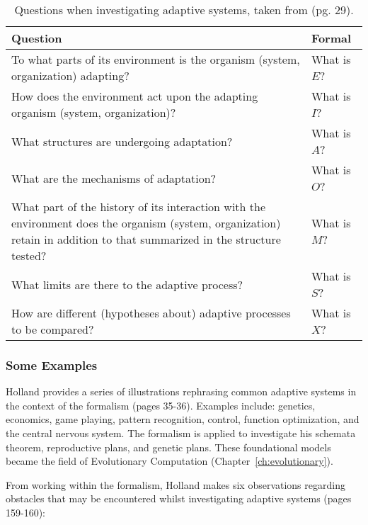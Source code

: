 \begin{table}[ht]
	\centering\small
		\begin{tabularx}{\textwidth}{Xl}
		\toprule
		\textbf{Question} & \textbf{Formal} \\ 
		\toprule
		To what parts of its environment is the organism (system, organization) adapting? & What is $E$? \\ 
		\midrule
		How does the environment act upon the adapting organism (system, organization)? & What is $I$? \\ 
		\midrule
		What structures are undergoing adaptation? & What is $A$? \\ 
		\midrule
		What are the mechanisms of adaptation? & What is $O$? \\ 
		\midrule
		What part of the history of its interaction with the environment does the organism (system, organization) retain in addition to that summarized in the structure tested? & What is $M$? \\ 
		\midrule
		What limits are there to the adaptive process? & What is $S$? \\ 
		\midrule
		How are different (hypotheses about) adaptive processes to be compared? & What is $X$? \\ 
		\bottomrule
		\end{tabularx}	
	\caption{Questions when investigating adaptive systems, taken from \cite{Holland1975} (pg. 29).}
	\label{tab:adaptsys:questions}
\end{table}


\subsubsection{Some Examples}
Holland provides a series of illustrations rephrasing common adaptive systems in the context of the formalism \cite{Holland1975} (pages 35-36). Examples include: genetics, economics, game playing, pattern recognition, control, function optimization, and the central nervous system. The formalism is applied to investigate his schemata theorem, reproductive plans, and genetic plans. These foundational models became the field of Evolutionary Computation (Chapter~\ref{ch:evolutionary}). 

From working within the formalism, Holland makes six observations regarding obstacles that may be encountered whilst investigating adaptive systems \cite{Holland1975} (pages 159-160): 

